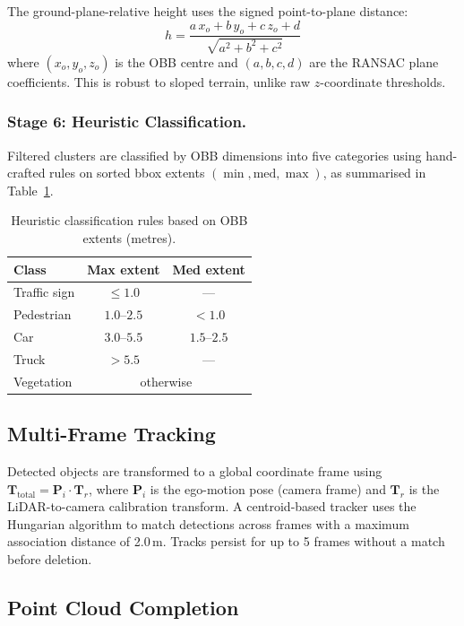 \documentclass[runningheads]{llncs}
\begin{document}
The ground-plane-relative height uses the signed point-to-plane distance:
\begin{equation}
h = \frac{a \, x_o + b \, y_o + c \, z_o + d}{\sqrt{a^2 + b^2 + c^2}}
\end{equation}
where $(x_o, y_o, z_o)$ is the OBB centre and $(a, b, c, d)$ are the RANSAC plane coefficients. This is robust to sloped terrain, unlike raw $z$-coordinate thresholds.

\subsubsection{Stage 6: Heuristic Classification.}
Filtered clusters are classified by OBB dimensions into five categories using hand-crafted rules on sorted bbox extents $(\min, \text{med}, \max)$, as summarised in Table~\ref{tab:class_rules}.

\begin{table}[htbp]
\caption{Heuristic classification rules based on OBB extents (metres).}\label{tab:class_rules}
\centering
\small
\begin{tabular}{@{}lcc@{}}
\toprule
Class & Max extent & Med extent \\
\midrule
Traffic sign & $\leq 1.0$ & --- \\
Pedestrian & $1.0$--$2.5$ & $< 1.0$ \\
Car & $3.0$--$5.5$ & $1.5$--$2.5$ \\
Truck & $> 5.5$ & --- \\
Vegetation & \multicolumn{2}{c}{otherwise} \\
\bottomrule
\end{tabular}
\end{table}

\subsection{Multi-Frame Tracking}

Detected objects are transformed to a global coordinate frame using $\mathbf{T}_{\text{total}} = \mathbf{P}_i \cdot \mathbf{T}_r$, where $\mathbf{P}_i$ is the ego-motion pose (camera frame) and $\mathbf{T}_r$ is the LiDAR-to-camera calibration transform. A centroid-based tracker uses the Hungarian algorithm to match detections across frames with a maximum association distance of 2.0\,m. Tracks persist for up to 5 frames without a match before deletion.


\subsection{Point Cloud Completion}
\end{document}
